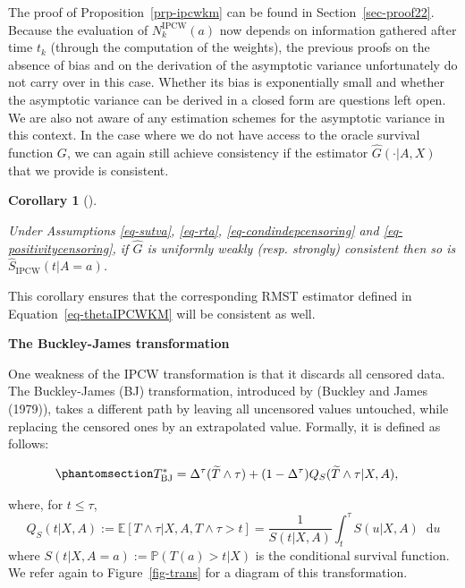 \documentclass[
  11pt,
  a4paper,
]{article}
\theoremstyle{plain}
\theoremstyle{plain}
\newtheorem{corollary}{Corollary}[section]
\theoremstyle{plain}
\theoremstyle{definition}
\theoremstyle{remark}
\begin{document}
The proof of Proposition~\ref{prp-ipcwkm} can be found in
Section~\ref{sec-proof22}. Because the evaluation of
\(N_k^{\textrm{IPCW}}(a)\) now depends on information gathered after
time \(t_k\) (through the computation of the weights), the previous
proofs on the absence of bias and on the derivation of the asymptotic
variance unfortunately do not carry over in this case. Whether its bias
is exponentially small and whether the asymptotic variance can be
derived in a closed form are questions left open. We are also not aware
of any estimation schemes for the asymptotic variance in this context.
In the case where we do not have access to the oracle survival function
\(G\), we can again still achieve consistency if the estimator
\(\widehat G(\cdot|A,X)\) that we provide is consistent.

\begin{corollary}[]\protect\hypertarget{cor-ipcwkmcons}{}\label{cor-ipcwkmcons}

Under Assumptions
\ref{eq-sutva}, \ref{eq-rta}, \ref{eq-condindepcensoring} and
\ref{eq-positivitycensoring}, if \(\widehat G\) is uniformly weakly
(resp. strongly) consistent then so is
\(\widehat S_{\mathrm{IPCW}}(t|A=a)\).

\end{corollary}

This corollary ensures that the corresponding RMST estimator defined in
Equation~\ref{eq-thetaIPCWKM} will be consistent as well.

\textbf{The Buckley-James transformation}

One weakness of the IPCW transformation is that it discards all censored
data. The Buckley-James (BJ) transformation, introduced by (Buckley and
James (1979)), takes a different path by leaving all uncensored values
untouched, while replacing the censored ones by an extrapolated value.
Formally, it is defined as follows:

\begin{equation}\phantomsection\label{eq-defbj}{
\begin{aligned}
T^*_{\mathrm{BJ}} &= \Delta^\tau (\widetilde{T}\wedge\tau) + (1-\Delta^\tau) Q_S(\widetilde T \wedge \tau|X,A),
\end{aligned}
}\end{equation}

where, for \(t \leqslant\tau\),
\[Q_S(t|X,A) :=\mathbb{E}[T \wedge \tau | X,A,T \wedge \tau > t]= \frac{1}{S(t|X,A)}\int_{t}^{\tau} S(u|X,A) \mathop{}\!\mathrm{d}u\]
where \(S(t|X,A=a) := \mathbb{P}(T(a) > t|X)\) is the conditional
survival function. We refer again to Figure~\ref{fig-trans} for a
diagram of this transformation.
\end{document}
